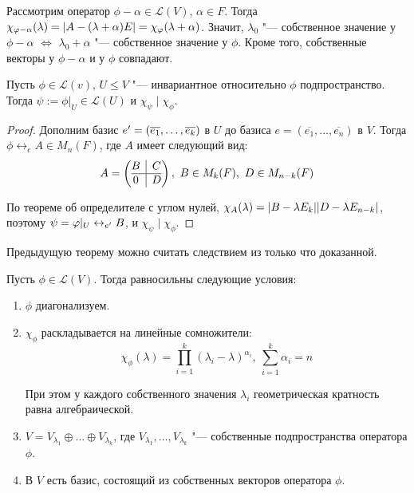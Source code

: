 \begin{note}
	Рассмотрим оператор $\phi - \alpha \in \mathcal{L}(V)$, $\alpha \in F$. Тогда $\chi_{\phi - \alpha}(\lambda) = |A - (\lambda + \alpha)E| \hm= \chi_{\phi}(\lambda + \alpha)$. Значит, $\lambda_0$ "--- собственное значение у $\phi - \alpha$ $\Leftrightarrow$ $\lambda_0 + \alpha$ "--- собственное значение у $\phi$. Кроме того, собственные векторы у $\phi - \alpha$ и у $\phi$ совпадают.
\end{note}

\begin{theorem}
	Пусть $\phi \in \mathcal{L}(v)$, $U \le V$ "--- инвариантное относительно $\phi$ подпространство. Тогда $\psi := \phi|_U \in \mathcal{L}(U)$ и $\chi_\psi\mid \chi_\phi$.
\end{theorem}

\begin{proof}
	Дополним базис $e' \hm{=} (\overline{e_1}, \dots, \overline{e_k})$ в $U$ до базиса $e = (\overline{e_1}, \dots, \overline{e_n})$ в $V$. Тогда $\phi \leftrightarrow_e A \in M_n(F)$, где $A$ имеет следующий вид:
	\[A = \left(\begin{array}{@{}c|c@{}}
		B & C\\
		\hline
		0 & D
	\end{array}\right),~B \in M_k(F),~D \in M_{n - k}(F)\]
	
	По теореме об определителе с углом нулей, $\chi_A(\lambda) \hm{=} |B - \lambda E_k||D \hm{-} \lambda E_{n - k}|$, поэтому $\psi \hm{=} \phi|_U \leftrightarrow_{e'} B$, и $\chi_\psi\mid \chi_\phi$.
\end{proof}

\begin{note}
	Предыдущую теорему можно считать следствием из только что доказанной.
\end{note}

\begin{theorem}
	Пусть $\phi \in \mathcal{L}(V)$. Тогда равносильны следующие условия:
	\begin{enumerate}
		\item $\phi$ диагонализуем.
		\item $\chi_\phi$ раскладывается на линейные сомножители:
		\[\chi_\phi(\lambda) = \prod_{i = 1}^k(\lambda_i - \lambda)^{\alpha_i},~\sum_{i = 1}^k\alpha_i = n\]
		
		При этом у каждого собственного значения $\lambda_i$ геометрическая кратность равна алгебраической.
		\item $V = V_{\lambda_1} \oplus \dots \oplus V_{\lambda_k}$, где $V_{\lambda_1}, \dots, V_{\lambda_k}$ "--- собственные подпространства оператора $\phi$.
		\item В $V$ есть базис, состоящий из собственных векторов оператора $\phi$.
	\end{enumerate}
\end{theorem}

